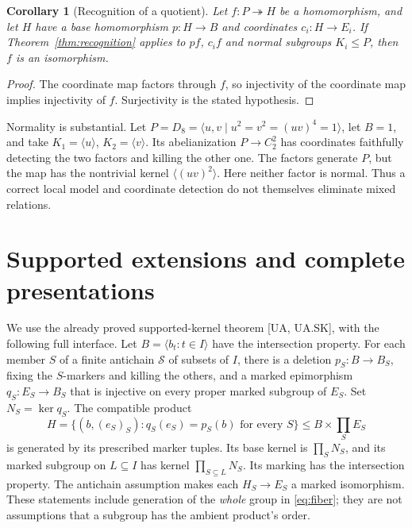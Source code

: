 \documentclass[11pt,a4paper]{article}
\newtheorem{corollary}[theorem]{Corollary}
\theoremstyle{remark}\newtheorem{remark}[theorem]{Remark}
\newcommand{\gen}[1]{\langle #1\rangle}
\begin{document}
\begin{corollary}[Recognition of a quotient]\label{cor:quotient}
Let $f:P\twoheadrightarrow H$ be a homomorphism, and let $H$ have a base
homomorphism $p:H\to B$ and coordinates $c_i:H\to E_i$. If
Theorem~\ref{thm:recognition} applies to $p f$, $c_i f$ and normal subgroups
$K_i\leq P$, then $f$ is an isomorphism.
\end{corollary}
\begin{proof}
The coordinate map factors through $f$, so injectivity of the coordinate map
implies injectivity of $f$. Surjectivity is the stated hypothesis.
\end{proof}

Normality is substantial. Let $P=D_8=\gen{u,v\mid u^2=v^2=(uv)^4=1}$,
let $B=1$, and take $K_1=\gen u$, $K_2=\gen v$. Its abelianization
$P\to C_2^2$ has coordinates faithfully detecting the two factors and killing
the other one. The factors generate $P$, but the map has the nontrivial kernel
$\gen{(uv)^2}$. Here neither factor is normal. Thus a correct local model and
coordinate detection do not themselves eliminate mixed relations.

\section{Supported extensions and complete presentations}
We use the already proved supported-kernel theorem [UA, UA.SK], with the
following full interface. Let $B=\gen{b_t:t\in I}$ have the intersection
property. For each member $S$ of a finite antichain $\mathcal S$ of subsets
of $I$, there is a deletion $p_S:B\to B_S$, fixing the $S$-markers and
killing the others, and a marked epimorphism $q_S:E_S\to B_S$ that is
injective on every proper marked subgroup of $E_S$. Set $N_S=\ker q_S$.
The compatible product
\begin{equation}
 H=\{(b,(e_S)_S):q_S(e_S)=p_S(b)\text{ for every }S\}
 \leq B\times\prod_S E_S                                      \label{eq:fiber}
\end{equation}
is generated by its prescribed marker tuples. Its base kernel is
$\prod_S N_S$, and its marked subgroup on $L\subseteq I$ has kernel
$\prod_{S\subseteq L}N_S$. Its marking has the intersection property.
The antichain assumption makes each $H_S\to E_S$ a marked isomorphism.
These statements include generation of the \emph{whole} group in
\eqref{eq:fiber}; they are not assumptions that a subgroup has the ambient
product's order.
\end{document}
